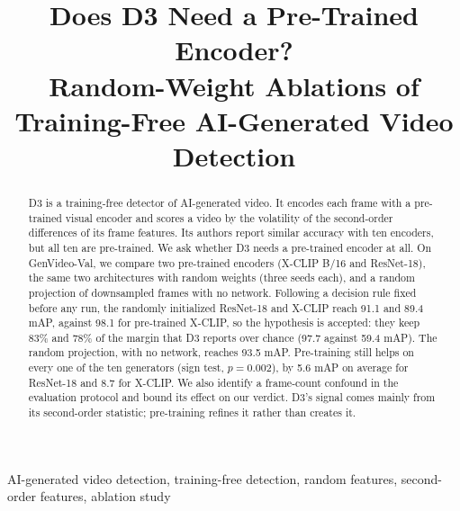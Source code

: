 \documentclass[conference]{IEEEtran}
\begin{document}

\title{Does D3 Need a Pre-Trained Encoder?\\
Random-Weight Ablations of Training-Free AI-Generated Video Detection}

\author{
\and
{}
}

\maketitle
\pagestyle{plain}\thispagestyle{plain} %

\begin{abstract}
D3 is a training-free detector of AI-generated video. It encodes each frame
with a pre-trained visual encoder and scores a video by the volatility of the
second-order differences of its frame features. Its authors report similar
accuracy with ten encoders, but all ten are pre-trained. We ask whether D3
needs a pre-trained encoder at all. On GenVideo-Val, we compare two pre-trained
encoders (X-CLIP B/16 and ResNet-18), the same two architectures with random
weights (three seeds each), and a random projection of downsampled frames with
no network. Following a decision rule fixed before any run, the randomly
initialized ResNet-18 and X-CLIP reach 91.1 and 89.4 mAP, against 98.1 for
pre-trained X-CLIP, so the hypothesis is accepted: they keep 83\% and 78\% of
the margin that D3 reports over chance (97.7 against 59.4 mAP). The random
projection, with no network, reaches 93.5 mAP. Pre-training still helps on
every one of the ten generators (sign test, $p = 0.002$), by 5.6 mAP on average
for ResNet-18 and 8.7 for X-CLIP. We also identify a
frame-count confound in the evaluation protocol and bound its effect on our
verdict. D3's signal comes mainly from its second-order statistic;
pre-training refines it rather than creates it.
\end{abstract}

\begin{IEEEkeywords}
AI-generated video detection, training-free detection, random features,
second-order features, ablation study
\end{IEEEkeywords}
\end{document}
